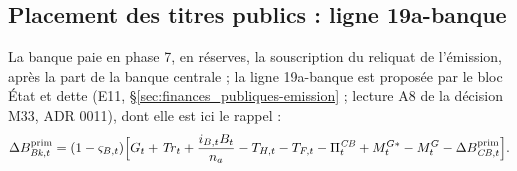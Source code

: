 \documentclass[11pt,a4paper]{article}
\begin{document}
\subsection{Placement des titres publics : ligne 19a-banque}
\label{sec:banque-placement}
\begin{proposee}
La banque paie en phase 7, en réserves, la souscription du reliquat de l'émission, après la part de la banque centrale ; la ligne 19a-banque est proposée par le bloc État et dette (E11, \S\ref{sec:finances_publiques-emission} ; lecture A8 de la décision M33, ADR 0011), dont elle est ici le rappel :
\begin{equation*}
\Delta B^{\mathrm{prim}}_{\mathit{Bk},t} = (1 - \varsigma_{B,t}) \Bigl[G_t + \mathit{Tr}_t + \frac{i_{B,t} B_t}{n_a} - T_{H,t} - T_{F,t} - \Pi^{\mathit{CB}}_t + M^{G*}_t - M^G_t - \Delta B^{\mathrm{prim}}_{\mathit{CB},t}\Bigr] .
\end{equation*}


\end{proposee}
\end{document}
